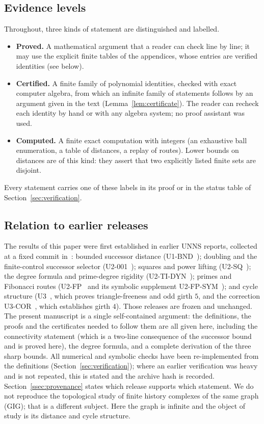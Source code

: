\subsection{Evidence levels}
Throughout, three kinds of statement are distinguished and labelled.
\begin{itemize}[itemsep=1pt]
\item \textbf{Proved.} A mathematical argument that a reader can check line by line; it may use the explicit finite tables of the appendices, whose entries are verified identities (see below).
\item \textbf{Certified.} A finite family of polynomial identities, checked with exact computer algebra, from which an infinite family of statements follows by an argument given in the text (Lemma~\ref{lem:certificate}). The reader can recheck each identity by hand or with any algebra system; no proof assistant was used.
\item \textbf{Computed.} A finite exact computation with integers (an exhaustive ball enumeration, a table of distances, a replay of routes). Lower bounds on distances are of this kind: they assert that two explicitly listed finite sets are disjoint.
\end{itemize}
Every statement carries one of these labels in its proof or in the status table of Section~\ref{sec:verification}.

\subsection{Relation to earlier releases}
The results of this paper were first established in earlier UNNS reports, collected at a fixed commit in~\cite{coll}: bounded successor distance (U1-BND~\cite{u1bnd}); doubling and the finite-control successor selector (U2-001~\cite{u2}); squares and power lifting (U2-SQ~\cite{u2sq}); the degree formula and prime-degree rigidity (U2-TI-DYN~\cite{u2tidyn}); primes and Fibonacci routes (U2-FP~\cite{u2fp} and its symbolic supplement U2-FP-SYM~\cite{u2fpsym}); and cycle structure (U3~\cite{u3}, which proves triangle-freeness and odd girth $5$, and the correction U3-COR~\cite{u3cor}, which establishes girth $4$).
Those releases are frozen and unchanged. The present manuscript is a single self-contained argument: the definitions, the proofs and the certificates needed to follow them are all given here, including the connectivity statement (which is a two-line consequence of the successor bound and is proved here), the degree formula, and a complete derivation of the three sharp bounds. All numerical and symbolic checks have been re-implemented from the definitions (Section~\ref{sec:verification}); where an earlier verification was heavy and is not repeated, this is stated and the archive hash is recorded. Section~\ref{ssec:provenance} states which release supports which statement.
We do not reproduce the topological study of finite history complexes of the same graph (GIG); that is a different subject. Here the graph is infinite and the object of study is its distance and cycle structure.


